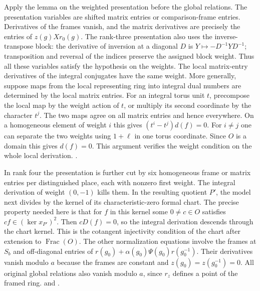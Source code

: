 Apply the lemma on the weighted presentation before the global
relations. The presentation variables are shifted matrix entries or
comparison-frame entries. Derivatives of the frames vanish, and the
matrix derivatives are precisely the entries of \(z(g)Xr_0(g)\).
The rank-three presentation also uses the inverse-transpose block:
the derivative of inversion at a diagonal \(D\) is
\(Y\mapsto-D^{-1}YD^{-1}\); transposition and reversal of the indices
preserve the assigned block weight. Thus all these variables satisfy
the hypothesis on the weights. The local matrix-entry derivatives of
the integral conjugates have the same weight. More generally, suppose
maps from the local representing ring into integral dual numbers are
determined by the local matrix entries. For an integral torus unit
\(t\), precompose the local map by the weight action of \(t\), or
multiply its second coordinate by the character \(t^j\). The two maps
agree on all matrix entries and hence everywhere. On a homogeneous
element of weight \(i\) this gives \((t^i-t^j)d(f)=0\). For \(i\ne j\)
one can separate the two weights using \(1+\ell\) in one torus
coordinate. Since \(O\) is a domain this gives \(d(f)=0\). This
argument verifies the weight condition on the whole local derivation.
.

In rank four the presentation is further cut by six homogeneous frame
or matrix entries per distinguished place, each with nonzero first
weight. The integral derivation of weight \((0,-1)\) kills them.
In the resulting quotient \(P'\), the model next divides by the kernel
of its characteristic-zero formal chart. The precise property needed
here is that for \(f\) in this kernel some \(0\ne c\in O\) satisfies
\(cf\in(\ker x_{P'})^2\). Then \(cD(f)=0\), so the integral derivation
descends through the chart kernel. This is the cotangent injectivity
condition of the chart after extension to \(\operatorname{Frac}(O)\).
The other normalization equations involve the frames at \(S_b\) and
off-diagonal entries of \(r(g_0)+\alpha(g_0)\Psi(g_0)r(g_0^{-1})\).
Their derivatives vanish modulo \(a\) because the frames are constant
and \(z(g_0)=z(g_0^{-1})=0\). All original global relations also vanish
modulo \(a\), since \(r_z\) defines a point of the framed ring.
and .

